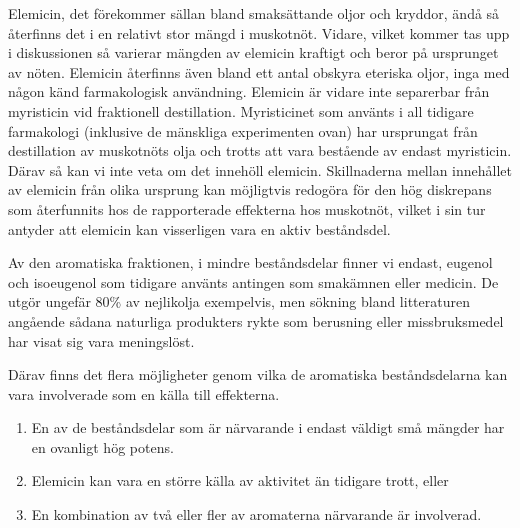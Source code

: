 \documentclass[a4paper,margin=3.25cm]{article}
\begin{document}
{Elemicin, det förekommer sällan bland smaksättande oljor och kryddor, ändå så
återfinns det i en relativt stor mängd i muskotnöt. Vidare, vilket kommer tas upp i diskussionen så varierar mängden av elemicin kraftigt och beror på ursprunget av nöten. Elemicin återfinns även bland ett antal obskyra eteriska oljor, inga med någon känd farmakologisk användning. Elemicin är vidare inte separerbar från myristicin vid fraktionell destillation. Myristicinet som använts i all tidigare farmakologi (inklusive de mänskliga experimenten ovan) har ursprungat från destillation av muskotnöts olja och trotts att vara bestående av endast myristicin. Därav så kan vi inte veta om det innehöll elemicin.
Skillnaderna mellan innehållet av elemicin från olika ursprung kan möjligtvis redogöra för den hög diskrepans som återfunnits hos de rapporterade effekterna hos muskotnöt, vilket i sin tur antyder att elemicin kan visserligen vara en aktiv beståndsdel.

Av den aromatiska fraktionen, i mindre beståndsdelar finner vi endast, eugenol och isoeugenol som tidigare använts antingen som smakämnen eller medicin.
De utgör ungefär 80\% av nejlikolja exempelvis, men sökning bland litteraturen angående sådana naturliga produkters rykte som berusning eller missbruksmedel har visat sig vara meningslöst.

Därav finns det flera möjligheter genom vilka de aromatiska beståndsdelarna kan vara involverade som en källa till effekterna.
\begin{enumerate}
	\setlength\itemsep{0em}
\item En av de beståndsdelar som är närvarande i endast väldigt små mängder har en ovanligt hög potens.
\item Elemicin kan vara en större källa av aktivitet än tidigare trott, eller
\item En kombination av två eller fler av aromaterna närvarande är involverad.
\end{enumerate}





}
\end{document}
